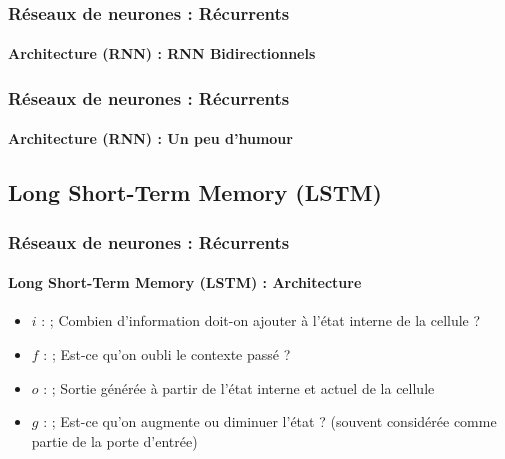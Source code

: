 \documentclass[xcolor=table]{beamer}
\begin{document}
\begin{frame}
	\frametitle{Réseaux de neurones : Récurrents}
	\framesubtitle{Architecture (RNN) : RNN Bidirectionnels}
	
	\begin{center}
	\end{center}
	
\end{frame}

\begin{frame}
	\frametitle{Réseaux de neurones : Récurrents}
	\framesubtitle{Architecture (RNN) : Un peu d'humour}
	
	\begin{center}
	\end{center}
	
\end{frame}


\subsection{Long Short-Term Memory (LSTM)}

\begin{frame}
\frametitle{Réseaux de neurones : Récurrents}
\framesubtitle{Long Short-Term Memory (LSTM) : Architecture}

\begin{minipage}{0.50\textwidth} 
	\begin{itemize}
		\item $i$ :  ;
		Combien d'information doit-on ajouter à l'état interne de la cellule ?
		\item $f$ :  ;
		Est-ce qu'on oubli le contexte passé ?
		\item $o$ :  ;
		Sortie générée à partir de l'état interne et actuel de la cellule	
	\end{itemize}
\end{minipage}
%
\begin{minipage}{0.49\textwidth}
\end{minipage}

\begin{itemize}
	\item $g$ :  ;
	Est-ce qu'on augmente ou diminuer l'état ?
	(souvent considérée comme partie de la porte d'entrée)
\end{itemize}

\end{frame}
\end{document}
